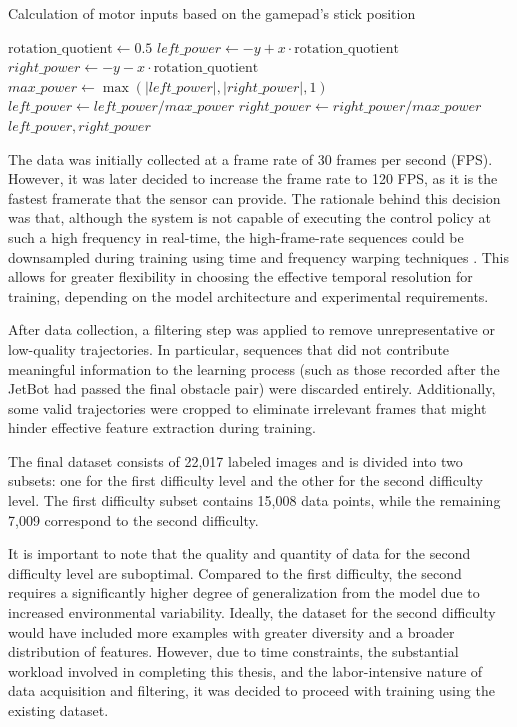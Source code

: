 \begin{algorithm}
  \caption{Calculation of motor inputs based on the gamepad's stick position}
  \begin{algorithmic}[1]
    \State $\text{rotation\_quotient} \gets 0.5$
    \State $left\_power \gets -y + x \cdot \text{rotation\_quotient}$
    \State $right\_power \gets -y - x \cdot \text{rotation\_quotient}$
    \State $max\_power \gets \max\left( \left|left\_power\right|, \left|right\_power\right|, 1 \right)$
    \State $left\_power \gets left\_power / max\_power$
    \State $right\_power \gets right\_power / max\_power$
    \State \Return $left\_power, right\_power$
    \EndFunction
  \end{algorithmic}
  \label{alg:motor_inputs}
\end{algorithm}

The data was initially collected at a frame rate of 30 frames per second (FPS). However, it was later decided to increase the frame rate to 120 FPS, as it is the fastest framerate that the sensor can provide. The rationale behind this decision was that, although the system is not capable of executing the control policy at such a high frequency in real-time, the high-frame-rate sequences could be downsampled during training using time and frequency warping techniques \autocite{iglesias2023data}. This allows for greater flexibility in choosing the effective temporal resolution for training, depending on the model architecture and experimental requirements.

After data collection, a filtering step was applied to remove unrepresentative or low-quality trajectories. In particular, sequences that did not contribute meaningful information to the learning process (such as those recorded after the JetBot had passed the final obstacle pair) were discarded entirely. Additionally, some valid trajectories were cropped to eliminate irrelevant frames that might hinder effective feature extraction during training.

The final dataset consists of 22,017 labeled images and is divided into two subsets: one for the first difficulty level and the other for the second difficulty level. The first difficulty subset contains 15,008 data points, while the remaining 7,009 correspond to the second difficulty.

It is important to note that the quality and quantity of data for the second difficulty level are suboptimal. Compared to the first difficulty, the second requires a significantly higher degree of generalization from the model due to increased environmental variability. Ideally, the dataset for the second difficulty would have included more examples with greater diversity and a broader distribution of features. However, due to time constraints, the substantial workload involved in completing this thesis, and the labor-intensive nature of data acquisition and filtering, it was decided to proceed with training using the existing dataset.


